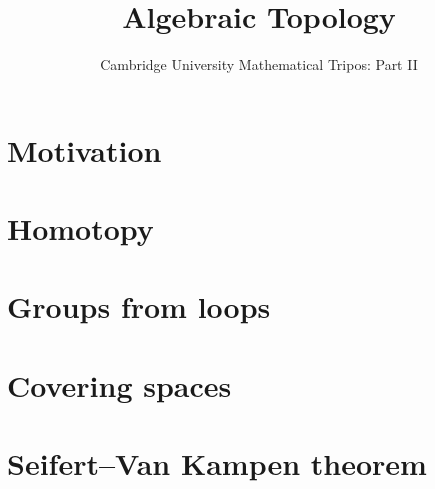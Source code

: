 \documentclass{article}
\title{Algebraic Topology}
\author{Cambridge University Mathematical Tripos: Part II}
\begin{document}
\maketitle

\tableofcontentsnewpage{}

\section{Motivation}

\section{Homotopy}

\section{Groups from loops}

\section{Covering spaces}

\section{Seifert--Van Kampen theorem}

\end{document}
